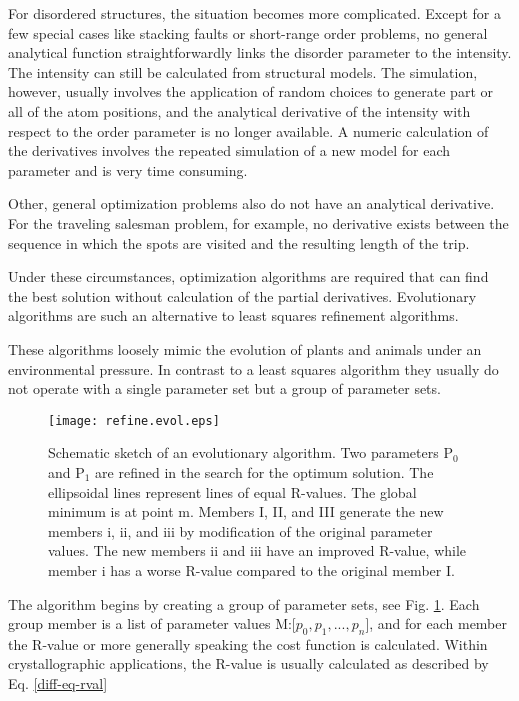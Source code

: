 For disordered structures, the situation becomes more complicated.
Except for a few special cases like stacking faults or short-range
order problems, no general analytical function straightforwardly 
links the disorder parameter to the intensity. The intensity 
can still be calculated from structural models. The simulation,
however, usually involves the application of random choices 
to generate part or all of the atom positions, and the analytical
derivative of the intensity with respect to the order parameter
is no longer available. A numeric calculation of the derivatives
involves the repeated simulation of a new model for each parameter
and is very time consuming.

Other, general optimization problems also do not have an 
analytical derivative. For the traveling salesman problem, for 
example, no derivative exists between the sequence in which the 
spots are visited and the resulting length of the trip.

Under these circumstances, optimization algorithms are required 
that can find the best solution without calculation of the 
partial derivatives. Evolutionary algorithms are such an alternative to 
least squares refinement algorithms.

These algorithms loosely mimic the evolution of plants and animals
under an environmental pressure. In contrast to a least squares
algorithm they usually do not operate with a single parameter set
but a group of parameter sets.

\begin{figure}[htbp]
   \texttt{[image: refine.evol.eps]}
   \caption{Schematic sketch of an evolutionary algorithm.
    Two parameters P$_{0}$ and P$_{1}$ are refined in the search
    for the optimum solution. The ellipsoidal lines represent 
    lines of equal R-values. The global minimum is at point m.
    Members I, II, and III generate the new members i, ii, and iii
    by modification of the original parameter values.
    The new members ii and iii have an improved R-value, while
    member i has a worse R-value compared to the original member I.}
   \label{evo-evol}
\end{figure}

The algorithm begins by creating a group of parameter sets, see Fig.
\ref{evo-evol}. Each group 
member is a list of parameter values M:[$p_{0}, p_{1}, ..., p_{n}$],
and for each member the R-value or more generally speaking the
cost function is calculated. Within crystallographic applications, 
the R-value is usually calculated as described by Eq. \ref{diff-eq-rval}

